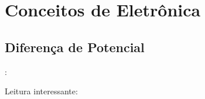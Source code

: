 \section{Conceitos de Eletrônica}


\subsection{Diferença de Potencial}


\begin{frame}[b]{\insertsection: \insertsubsection}

	\vfill
	Leitura interessante: 

\end{frame}




